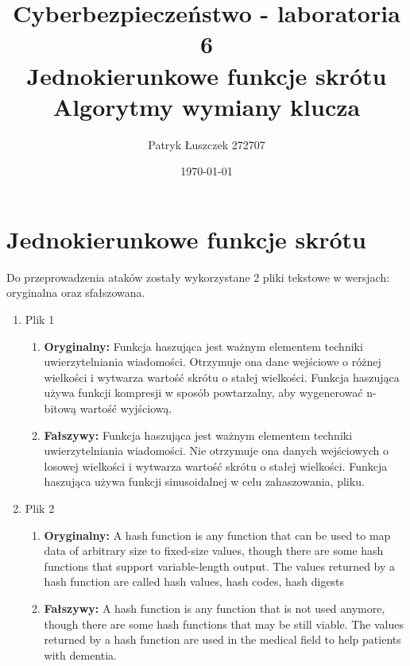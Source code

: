 \documentclass{article}
\title{%
  Cyberbezpieczeństwo - laboratoria 6 \\
  \large Jednokierunkowe funkcje skrótu \\ Algorytmy wymiany klucza
  }
\author{Patryk Łuszczek 272707}
\date{\today}
\begin{document}
\maketitle
\newpage
\tableofcontents
\newpage

\section{Jednokierunkowe funkcje skrótu}
Do przeprowadzenia ataków zostały wykorzystane 2 pliki tekstowe w wersjach: oryginalna oraz sfałszowana.
\begin{enumerate}
  \item Plik 1
        \begin{enumerate}
          \item \textbf{Oryginalny: } Funkcja haszująca jest ważnym elementem techniki uwierzytelniania wiadomości.
                Otrzymuje ona dane wejściowe o różnej wielkości i wytwarza wartość skrótu o stałej
                wielkości.
                Funkcja haszująca używa funkcji kompresji w sposób powtarzalny, aby
                wygenerować n-bitową wartość wyjściową.
          \item \textbf{Fałszywy: } Funkcja haszująca jest ważnym elementem techniki uwierzytelniania wiadomości.
                Nie otrzymuje ona danych wejściowych o losowej wielkości i wytwarza wartość skrótu o stałej wielkości.
                Funkcja haszująca używa funkcji sinusoidalnej w celu zahaszowania, pliku.
        \end{enumerate}
  \item Plik 2
        \begin{enumerate}
          \item \textbf{Oryginalny: } A hash function is any function that can be used to map data of arbitrary size to fixed-size values, though there are some hash functions that support variable-length output.
                The values returned by a hash function are called hash values, hash codes, hash digests
          \item \textbf{Fałszywy: } A hash function is any function that is not used anymore, though there are some hash functions that may be still viable.
                The values returned by a hash function are used in the medical field to help patients with dementia.
        \end{enumerate}
\end{enumerate}
\end{document}

